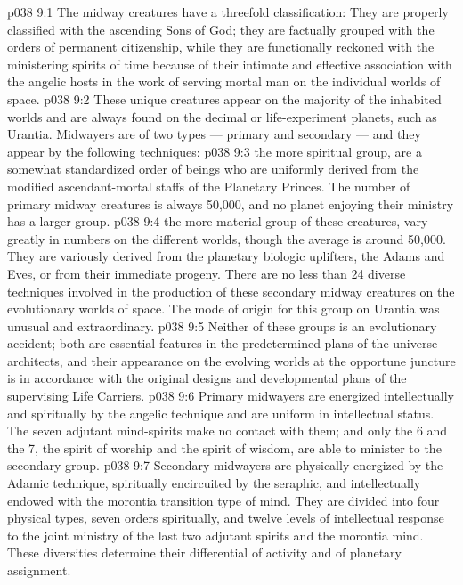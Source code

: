 \vs p038 9:1 The midway creatures have a threefold classification: They are properly classified with the ascending Sons of God; they are factually grouped with the orders of permanent citizenship, while they are functionally reckoned with the ministering spirits of time because of their intimate and effective association with the angelic hosts in the work of serving mortal man on the individual worlds of space.
\vs p038 9:2 These unique creatures appear on the majority of the inhabited worlds and are always found on the decimal or life\hyp{}experiment planets, such as Urantia. Midwayers are of two types --- primary and secondary --- and they appear by the following techniques:
\vs p038 9:3 \bibnobreakspace {} the more spiritual group, are a somewhat standardized order of beings who are uniformly derived from the modified ascendant\hyp{}mortal staffs of the Planetary Princes. The number of primary midway creatures is always 50,000, and no planet enjoying their ministry has a larger group.
\vs p038 9:4 \bibnobreakspace {} the more material group of these creatures, vary greatly in numbers on the different worlds, though the average is around 50,000. They are variously derived from the planetary biologic uplifters, the Adams and Eves, or from their immediate progeny. There are no less than 24 diverse techniques involved in the production of these secondary midway creatures on the evolutionary worlds of space. The mode of origin for this group on Urantia was unusual and extraordinary.
\vs p038 9:5 \pc Neither of these groups is an evolutionary accident; both are essential features in the predetermined plans of the universe architects, and their appearance on the evolving worlds at the opportune juncture is in accordance with the original designs and developmental plans of the supervising Life Carriers.
\vs p038 9:6 Primary midwayers are energized intellectually and spiritually by the angelic technique and are uniform in intellectual status. The seven adjutant mind\hyp{}spirits make no contact with them; and only the 6 and the 7, the spirit of worship and the spirit of wisdom, are able to minister to the secondary group.
\vs p038 9:7 Secondary midwayers are physically energized by the Adamic technique, spiritually encircuited by the seraphic, and intellectually endowed with the morontia transition type of mind. They are divided into four physical types, seven orders spiritually, and twelve levels of intellectual response to the joint ministry of the last two adjutant spirits and the morontia mind. These diversities determine their differential of activity and of planetary assignment.
